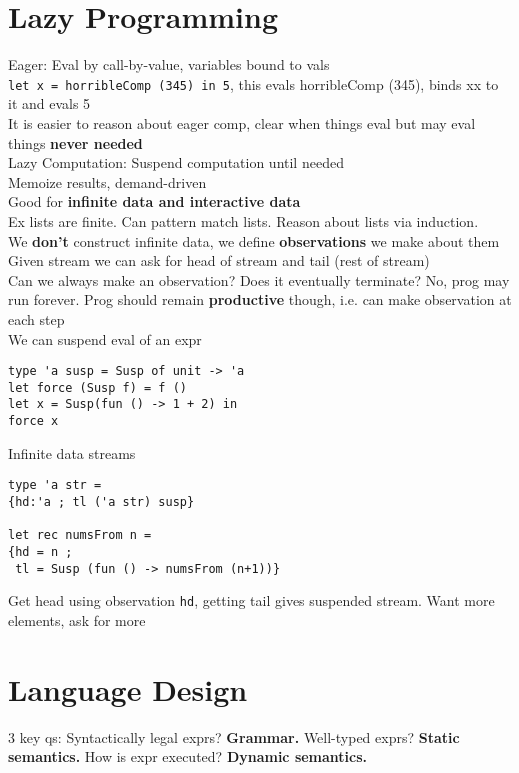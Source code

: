 \section{Lazy Programming}
Eager: Eval by call-by-value, variables bound to vals
\\ \texttt{let x = horribleComp (345) in 5}, this evals horribleComp
(345), binds xx  to it and evals 5
\\ It is easier to reason about eager comp, clear when things eval but
may eval things \textbf{never needed}
\\ Lazy Computation: Suspend computation until needed
\\ Memoize results, demand-driven
\\ Good for \textbf{infinite data and interactive data}
\\ Ex lists are finite. Can pattern match lists. Reason about lists
via induction.
\\ We \textbf{don't} construct infinite data, we define
\textbf{observations} we make about them
\\ Given stream we can ask for head of stream and tail (rest of
stream)
\\ Can we always make an observation? Does it eventually terminate?
No, prog may run forever. Prog should remain \textbf{productive}
though, i.e. can make observation at each step
\\ We can suspend eval of an expr
\begin{lstlisting}
type 'a susp = Susp of unit -> 'a
let force (Susp f) = f ()
let x = Susp(fun () -> 1 + 2) in
force x
\end{lstlisting}
Infinite data streams
\begin{lstlisting}
type 'a str =
{hd:'a ; tl ('a str) susp}

let rec numsFrom n = 
{hd = n ; 
 tl = Susp (fun () -> numsFrom (n+1))}
\end{lstlisting}
Get head using observation \texttt{hd}, getting tail gives suspended
stream. Want more elements, ask for more
\color{Black}
\section{Language Design}
3 key qs: Syntactically legal exprs? \textbf{Grammar.} Well-typed
exprs? \textbf{Static semantics.} How is expr executed?
\textbf{Dynamic semantics.}
\vspace{-1 em}

